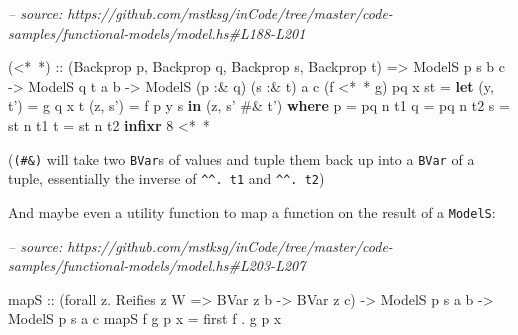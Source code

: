 \documentclass[]{article}
\newenvironment{Shaded}{}{}
\newcommand{\CommentTok}[1]{\textcolor[rgb]{0.38,0.63,0.69}{\textit{#1}}}
\newcommand{\DataTypeTok}[1]{\textcolor[rgb]{0.56,0.13,0.00}{#1}}
\newcommand{\DecValTok}[1]{\textcolor[rgb]{0.25,0.63,0.44}{#1}}
\newcommand{\FunctionTok}[1]{\textcolor[rgb]{0.02,0.16,0.49}{#1}}
\newcommand{\KeywordTok}[1]{\textcolor[rgb]{0.00,0.44,0.13}{\textbf{#1}}}
\newcommand{\NormalTok}[1]{#1}
\newcommand{\OtherTok}[1]{\textcolor[rgb]{0.00,0.44,0.13}{#1}}
\begin{document}
\begin{Shaded}
\begin{Highlighting}[]
\CommentTok{-- source: https://github.com/mstksg/inCode/tree/master/code-samples/functional-models/model.hs#L188-L201}

\NormalTok{(}\FunctionTok{<*~*}\NormalTok{)}
\OtherTok{  ::}\NormalTok{ (}\DataTypeTok{Backprop}\NormalTok{ p, }\DataTypeTok{Backprop}\NormalTok{ q, }\DataTypeTok{Backprop}\NormalTok{ s, }\DataTypeTok{Backprop}\NormalTok{ t)}
    \OtherTok{=>} \DataTypeTok{ModelS}\NormalTok{  p        s       b c}
    \OtherTok{->} \DataTypeTok{ModelS}\NormalTok{       q        t  a b}
    \OtherTok{->} \DataTypeTok{ModelS}\NormalTok{ (p }\FunctionTok{:&}\NormalTok{ q) (s }\FunctionTok{:&}\NormalTok{ t) a c}
\NormalTok{(f }\FunctionTok{<*~*}\NormalTok{ g) pq x st }\FunctionTok{=} \KeywordTok{let}\NormalTok{ (y, t') }\FunctionTok{=}\NormalTok{ g q x t}
\NormalTok{                         (z, s') }\FunctionTok{=}\NormalTok{ f p y s}
                     \KeywordTok{in}\NormalTok{  (z, s' }\FunctionTok{#&}\NormalTok{ t')}
  \KeywordTok{where}
\NormalTok{    p }\FunctionTok{=}\NormalTok{ pq }\FunctionTok{^^.}\NormalTok{ t1}
\NormalTok{    q }\FunctionTok{=}\NormalTok{ pq }\FunctionTok{^^.}\NormalTok{ t2}
\NormalTok{    s }\FunctionTok{=}\NormalTok{ st }\FunctionTok{^^.}\NormalTok{ t1}
\NormalTok{    t }\FunctionTok{=}\NormalTok{ st }\FunctionTok{^^.}\NormalTok{ t2}
\KeywordTok{infixr} \DecValTok{8} \FunctionTok{<*~*}
\end{Highlighting}
\end{Shaded}

(\texttt{(\#\&)} will take two \texttt{BVar}s of values and tuple them back up
into a \texttt{BVar} of a tuple, essentially the inverse of
\texttt{\^{}\^{}.\ t1} and \texttt{\^{}\^{}.\ t2})

And maybe even a utility function to map a function on the result of a
\texttt{ModelS}:

\begin{Shaded}
\begin{Highlighting}[]
\CommentTok{-- source: https://github.com/mstksg/inCode/tree/master/code-samples/functional-models/model.hs#L203-L207}

\NormalTok{mapS}
\OtherTok{    ::}\NormalTok{ (forall z}\FunctionTok{.} \DataTypeTok{Reifies}\NormalTok{ z }\DataTypeTok{W} \OtherTok{=>} \DataTypeTok{BVar}\NormalTok{ z b }\OtherTok{->} \DataTypeTok{BVar}\NormalTok{ z c)}
    \OtherTok{->} \DataTypeTok{ModelS}\NormalTok{ p s a b}
    \OtherTok{->} \DataTypeTok{ModelS}\NormalTok{ p s a c}
\NormalTok{mapS f g p x }\FunctionTok{=}\NormalTok{ first f }\FunctionTok{.}\NormalTok{ g p x}
\end{Highlighting}
\end{Shaded}
\end{document}
